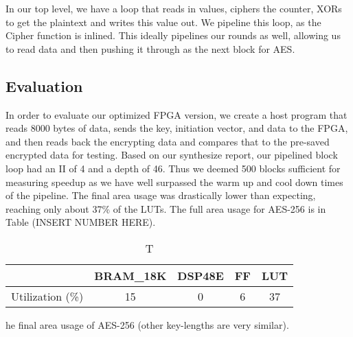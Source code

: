 In our top level, we have a loop that reads in values, ciphers the counter, XORs to get the plaintext and writes this value out. We pipeline this loop, as the Cipher function is inlined. This ideally pipelines our rounds as well, allowing us to read data and then pushing it through as the next block for AES.  

\subsection{Evaluation}
In order to evaluate our optimized FPGA version, we create a host program that reads 8000 bytes of data, sends the key, initiation vector, and data to the FPGA, and then reads back the encrypting data and compares that to the pre-saved encrypted data for testing. Based on our synthesize report, our pipelined block loop had an II of 4 and a depth of 46. Thus we deemed 500 blocks sufficient for measuring speedup as we have well surpassed the warm up and cool down times of the pipeline. The final area usage was drastically lower than expecting, reaching only about 37\% of the LUTs. The full area usage for AES-256 is in Table (INSERT NUMBER HERE). 

\begin{table}
\begin{center}
\begin{tabular}{| c | c | c | c | c |}\hline
& BRAM\_18K &  DSP48E &   FF    &  LUT \\\hline
Utilization (\%)  &       15 &      0 &       6 &     37 \\\hline
\end{tabular}
\caption The final area usage of AES-256 (other key-lengths are very similar).
\end{center}
\end{table}

